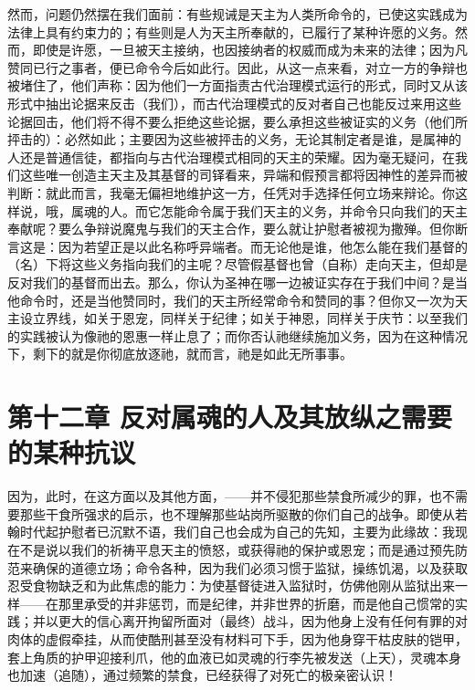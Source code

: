 然而，问题仍然摆在我们面前：有些规诫是天主为人类所命令的，已使这实践成为法律上具有约束力的；有些则是人为天主所奉献的，已履行了某种许愿的义务。然而，即使是许愿，一旦被天主接纳，也因接纳者的权威而成为未来的法律；因为凡赞同已行之事者，便已命令今后如此行。因此，从这一点来看，对立一方的争辩也被堵住了，他们声称：因为他们一方面指责古代治理模式运行的形式，同时又从该形式中抽出论据来反击（我们），而古代治理模式的反对者自己也能反过来用这些论据回击，他们将不得不要么拒绝这些论据，要么承担这些被证实的义务（他们所抨击的）：必然如此；主要因为这些被抨击的义务，无论其制定者是谁，是属神的人还是普通信徒，都指向与古代治理模式相同的天主的荣耀。因为毫无疑问，在我们这些唯一创造主天主及其基督的司铎看来，异端和假预言都将因神性的差异而被判断：就此而言，我毫无偏袒地维护这一方，任凭对手选择任何立场来辩论。你这样说，哦，属魂的人。而它怎能命令属于我们天主的义务，并命令只向我们的天主奉献呢？要么争辩说魔鬼与我们的天主合作，要么就让护慰者被视为撒殚。但你断言这是：因为若望正是以此名称呼异端者。而无论他是谁，他怎么能在我们基督的（名）下将这些义务指向我们的主呢？尽管假基督也曾（自称）走向天主，但却是反对我们的基督而出去。那么，你认为圣神在哪一边被证实存在于我们中间？是当他命令时，还是当他赞同时，我们的天主所经常命令和赞同的事？但你又一次为天主设立界线，如关于恩宠，同样关于纪律；如关于神恩，同样关于庆节：以至我们的实践被认为像祂的恩惠一样止息了；而你否认祂继续施加义务，因为在这种情况下，剩下的就是你彻底放逐祂，就而言，祂是如此无所事事。\par


\section{第十二章  反对属魂的人及其放纵之需要的某种抗议}

因为，此时，在这方面以及其他方面，——并不侵犯那些禁食所减少的罪，也不需要那些干食所强求的启示，也不理解那些站岗所驱散的你们自己的战争。即使从若翰时代起护慰者已沉默不语，我们自己也会成为自己的先知，主要为此缘故：我现在不是说以我们的祈祷平息天主的愤怒，或获得祂的保护或恩宠；而是通过预先防范来确保的道德立场；命令各种，因为我们必须习惯于监狱，操练饥渴，以及获取忍受食物缺乏和为此焦虑的能力：为使基督徒进入监狱时，仿佛他刚从监狱出来一样——在那里承受的并非惩罚，而是纪律，并非世界的折磨，而是他自己惯常的实践；并以更大的信心离开拘留所面对（最终）战斗，因为他身上没有任何有罪的对肉体的虚假牵挂，从而使酷刑甚至没有材料可下手，因为他身穿干枯皮肤的铠甲，套上角质的护甲迎接利爪，他的血液已如灵魂的行李先被发送（上天），灵魂本身也加速（追随），通过频繁的禁食，已经获得了对死亡的极亲密认识！\par

